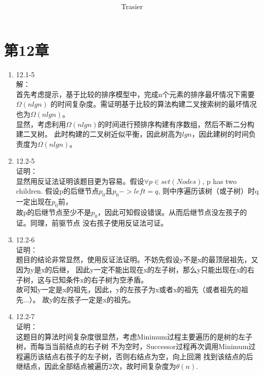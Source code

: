 \documentclass[UTF8]{ctexart}
\begin{document}
\title{\\}
\vspace{2cm}
\author{\Large Trasier}
\date{}
\maketitle

\section*{第12章}
\begin{enumerate}
    \item 12.1-5 \\
    解：\\
        首先考虑提示，基于比较的排序模型中，完成n个元素的排序最坏情况下需要$\Omega(nlgn)$
		的时间复杂度。需证明基于比较的算法构建二叉搜索树的最坏情况也为$\Omega(nlgn)$。\\
		显然，考虑利用$\Omega(nlgn)$的时间进行预排序构建有序数组，然后不断二分构建二叉树。
		此时构建的二叉树近似平衡，因此树高为$lgn$，因此建树的时间负责度为$\Omega(nlgn)$。
	
	\item 12.2-5 \\
	证明：\\
		显然用反证法证明该题目更为容易。假设$\forall p \in set(Nodes)$, p has two children.
		假设p的后继节点$p_0$且$p_0->left = q$, 则中序遍历该树（或子树）时q一定出现在$p_0$前，\\
		故p的后继节点至少不是$p_0$，因此可知假设错误。从而后继节点没左孩子的证。同理，前驱节点
		没右孩子使用反证法可证。

	\item 12.2-6 \\
	证明：\\
		题目的结论非常显然，使用反证法证明。不妨先假设y不是x的最顶层祖先，又因为y是x的后继，
		因此y一定不能出现在x的左子树，那么y只能出现在x的右子树，这与已知条件x的右子树为空矛盾。\\
		故可知y一定是x的祖先，因此，y的左孩子为x或者x的祖先（或者祖先的祖先...）。
		故y的左孩子一定是x的祖先。
		
	\item 12.2-7 \\
	证明：\\
		这题目的算法时间复杂度很显然，考虑Minimum过程主要遍历的是树的左子树，而每当当前结点的右子树
		不为空时，Successor过程再次调用Minimum过程遍历该结点右孩子的左子树，否则右结点为空，向上回溯
		找到该结点的后继结点，因此全部结点被遍历2次，故时间复杂度为$\theta(n)$.
		

\end{enumerate}
\end{document}
